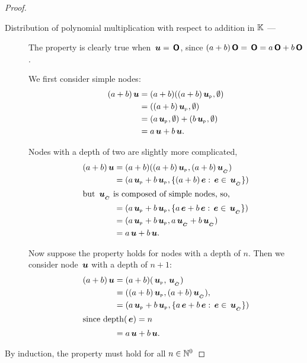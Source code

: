 \begin{proposition}
\begin{proof}
\begin{description}
    \item[Distribution of polynomial multiplication with respect to addition in $\FIELD$  --- ]

      The property is clearly true when $\node{u} = \zerotree$,
      since $(a+b)\zerotree = \zerotree = a\zerotree+b\zerotree$.

      We first consider simple nodes:
      \begin{align*}
        (a + b)\node{u} &= (a + b) ((a + b)\nlabel{u}, \emptyset) \\
        &= ((a + b)\nlabel{u}, \emptyset) \\
        &= (a\nlabel{u}, \emptyset) + (b\nlabel{u}, \emptyset) \\
        &= a \node{u} + b \node{u}.
      \end{align*}

      Nodes with a depth of two are slightly more complicated, 
      \begin{align*}
        (a + b)\node{u} &= (a + b) ((a + b)\nlabel{u}, (a + b)\child{u}) \\
        &= (a\nlabel{u} + b\nlabel{u}, \{(a + b)\node{e}:\node{e}\in\child{u}\}) \\
        \intertext{but $\child{u}$ is composed of simple nodes, so,}
        &= (a\nlabel{u} + b\nlabel{u}, \{a \node{e} + b \node{e}:\node{e}\in\child{u}\}) \\
        &= (a\nlabel{u} + b\nlabel{u}, a\child{u} + b\child{u}) \\
        &= a \node{u} + b\node{u}.
      \end{align*}

      Now suppose the property holds for nodes with a depth of $n$.
      Then we consider node $\node{u}$ with a depth of $n+1$:
      \begin{align*}
        (a + b)\node{u} &= (a + b) (\nlabel{u}, \child{u}) \\
        &= ((a + b)\nlabel{u}, (a + b)\child{u}), \\
        &= (a\nlabel{u} + b\nlabel{u}, \{a \node{e} + b \node{e}:\node{e}\in\child{u}\}) \\
        \intertext{since $\depth(\node{e}) = n$}
        &= a \node{u} + b \node{u}.
      \end{align*}

    \end{description}
    By induction, the property must hold for all $n \in\BBNO$
  \end{proof}
\end{proposition}


